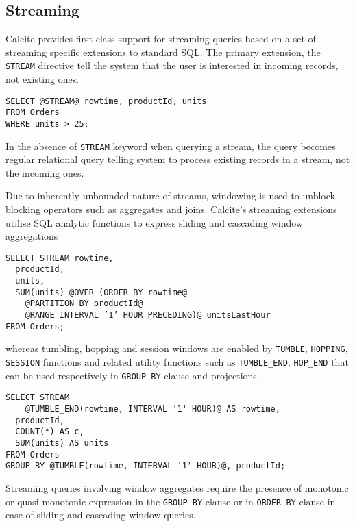 \subsection{Streaming}
\label{subsec:streaming}

Calcite provides first class support for streaming queries based on a set of streaming specific extensions to standard SQL. The primary extension, the \texttt{STREAM} directive tell the system that the user is interested in incoming records, not existing ones. 

\begin{lstlisting}[style=STREAMINGSQL]
SELECT @STREAM@ rowtime, productId, units 
FROM Orders
WHERE units > 25;
\end{lstlisting}

In the absence of \texttt{STREAM} keyword when querying a stream, the query becomes regular relational query telling system to process existing records in a stream, not the incoming ones. 

Due to inherently unbounded nature of streams, windowing is used to unblock blocking operators such as aggregates and joins. Calcite's streaming extensions utilise SQL analytic functions to express sliding and cascading window aggregations

\begin{lstlisting}[style=STREAMINGSQL]
SELECT STREAM rowtime,
  productId,
  units,
  SUM(units) @OVER (ORDER BY rowtime@
  	@PARTITION BY productId@
  	@RANGE INTERVAL ’1’ HOUR PRECEDING)@ unitsLastHour 
FROM Orders;
\end{lstlisting}

whereas tumbling, hopping and session windows are enabled by \texttt{TUMBLE}, \texttt{HOPPING}, \texttt{SESSION} functions and related utility functions such as \texttt{TUMBLE\_END}, \texttt{HOP\_END} that can be used respectively in \texttt{GROUP BY} clause and projections. 

\begin{lstlisting}[style=STREAMINGSQL]
SELECT STREAM 
	@TUMBLE_END(rowtime, INTERVAL '1' HOUR)@ AS rowtime,
  productId,
  COUNT(*) AS c,
  SUM(units) AS units
FROM Orders
GROUP BY @TUMBLE(rowtime, INTERVAL '1' HOUR)@, productId;
\end{lstlisting}

Streaming queries involving window aggregates require the presence of monotonic or quasi-monotonic expression in the \texttt{GROUP BY} clause or in \texttt{ORDER BY} clause in case of sliding and cascading window queries.

